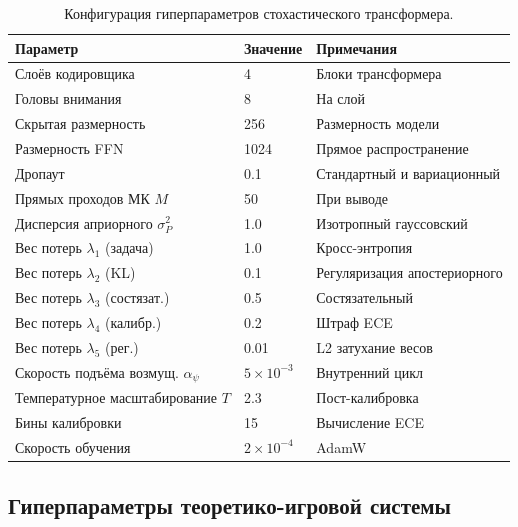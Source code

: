 \begin{table}[htbp]
\centering
\caption{Конфигурация гиперпараметров стохастического трансформера.}
\label{tab:hp_stochastic}
\begin{tabular}{lll}
\toprule
Параметр & Значение & Примечания \\
\midrule
Слоёв кодировщика          & 4     & Блоки трансформера \\
Головы внимания            & 8     & На слой \\
Скрытая размерность        & 256   & Размерность модели \\
Размерность FFN            & 1024  & Прямое распространение \\
Дропаут                    & 0.1   & Стандартный и вариационный \\
Прямых проходов МК $M$     & 50    & При выводе \\
Дисперсия априорного $\sigma_P^2$ & 1.0 & Изотропный гауссовский \\
Вес потерь $\lambda_1$ (задача) & 1.0 & Кросс-энтропия \\
Вес потерь $\lambda_2$ (KL)  & 0.1 & Регуляризация апостериорного \\
Вес потерь $\lambda_3$ (состязат.) & 0.5 & Состязательный \\
Вес потерь $\lambda_4$ (калибр.) & 0.2 & Штраф ECE \\
Вес потерь $\lambda_5$ (рег.)  & 0.01 & L2 затухание весов \\
Скорость подъёма возмущ. $\alpha_\psi$ & $5\times10^{-3}$ & Внутренний цикл \\
Температурное масштабирование $T$ & 2.3 & Пост-калибровка \\
Бины калибровки            & 15    & Вычисление ECE \\
Скорость обучения          & $2\times10^{-4}$ & AdamW \\
\bottomrule
\end{tabular}
\end{table}


\subsection{Гиперпараметры теоретико-игровой системы}
\label{app:hp_game}

